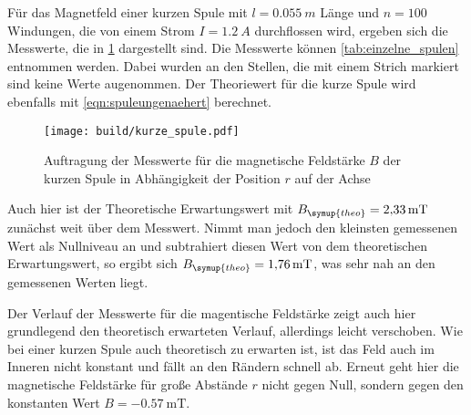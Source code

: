 Für das Magnetfeld einer kurzen Spule mit $l=\SI{0,055}{m}$ Länge und $n=100$ Windungen,
die von einem Strom $I=\SI{1,2}{A}$ durchflossen wird, ergeben sich die Messwerte, die in
\ref{fig:kurze_spule} dargestellt sind. Die Messwerte können \ref{tab:einzelne_spulen}
entnommen werden. Dabei wurden an den Stellen, die mit einem Strich markiert sind keine
Werte augenommen.
Der Theoriewert für die kurze Spule wird ebenfalls mit \ref{eqn:spuleungenaehert} berechnet.

\begin{figure}
  \centering
  \texttt{[image: build/kurze\_spule.pdf]}
  \caption{Auftragung der Messwerte für die magnetische Feldstärke $B$ der kurzen Spule
  in Abhängigkeit der Position $r$ auf der Achse}
  \label{fig:kurze_spule}
\end{figure}


Auch hier ist der Theoretische Erwartungswert mit $B_{\symup{theo}}=\SI{2,33}{\milli\tesla}$ zunächst
weit über dem Messwert. Nimmt man jedoch den kleinsten gemessenen Wert als Nullniveau
an und subtrahiert diesen Wert von dem theoretischen Erwartungswert, so ergibt sich
$B_{\symup{theo}}=\SI{1,76}{\milli\tesla}$, was sehr nah an den gemessenen Werten liegt.

Der Verlauf der Messwerte für die magentische Feldstärke zeigt auch hier grundlegend
den theoretisch erwarteten Verlauf, allerdings leicht verschoben. Wie bei einer kurzen Spule auch theoretisch
zu erwarten ist, ist das Feld auch im Inneren nicht konstant und fällt an den Rändern
schnell ab. Erneut geht hier die magnetische Feldstärke für große Abstände $r$ nicht
gegen Null, sondern gegen den konstanten Wert $B=\SI{-0,57}{\milli\tesla}$.


